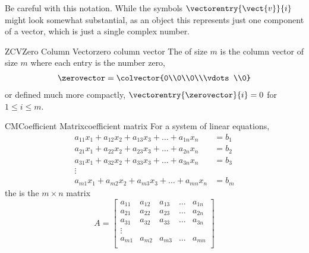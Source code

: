 %
Be careful with this notation.  While the symbols $\vectorentry{\vect{v}}{i}$ might look somewhat substantial, as an object this represents just one component of a vector, which is just a single complex number.
%
\begin{definition}{ZCV}{Zero Column Vector}{zero column vector}
The  of size $m$ is the column vector of size $m$ where each entry is the number zero,
%
\begin{align*}
\zerovector=
\colvector{0\\0\\0\\\vdots\\0}
\end{align*}
%
or defined much more compactly, $\vectorentry{\zerovector}{i}=0$ for $1\leq i\leq m$.
\end{definition}
%
\begin{definition}{CM}{Coefficient Matrix}{coefficient matrix}
For a system of linear equations,
\begin{align*}
a_{11}x_1+a_{12}x_2+a_{13}x_3+\dots+a_{1n}x_n&=b_1\\
a_{21}x_1+a_{22}x_2+a_{23}x_3+\dots+a_{2n}x_n&=b_2\\
a_{31}x_1+a_{32}x_2+a_{33}x_3+\dots+a_{3n}x_n&=b_3\\
\vdots&\\
a_{m1}x_1+a_{m2}x_2+a_{m3}x_3+\dots+a_{mn}x_n&=b_m
\end{align*}
the  is the $m\times n$ matrix
\begin{equation*}
A=
\begin{bmatrix}
a_{11}&a_{12}&a_{13}&\dots&a_{1n}\\
a_{21}&a_{22}&a_{23}&\dots&a_{2n}\\
a_{31}&a_{32}&a_{33}&\dots&a_{3n}\\
\vdots&\\
a_{m1}&a_{m2}&a_{m3}&\dots&a_{mn}\\
\end{bmatrix}
\end{equation*}
\end{definition}
%
